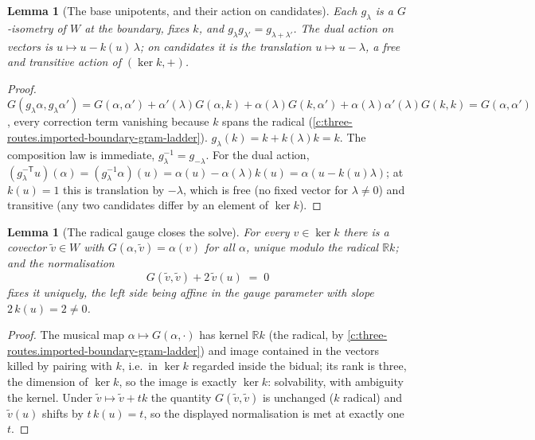 \documentclass[11pt]{article}
\newtheorem{lemma}[theorem]{Lemma}
\theoremstyle{definition}
\theoremstyle{plain}
\providecommand{\R}{}\renewcommand{\R}{\mathbb{R}}
\begin{document}
\begin{lemma}[The base unipotents, and their action on candidates]\label{c:three-routes.base-unipotents-their-action-candidates}
Each $g_\lambda$ is a $G$-isometry of $W$ at the boundary, fixes $k$, and $g_\lambda g_{\lambda'} = g_{\lambda + \lambda'}$. The dual action on vectors is $u \mapsto u - k(u)\,\lambda$; on candidates it is the translation $u \mapsto u - \lambda$, a free and transitive action of $(\ker k, +)$.
\end{lemma}
\begin{proof}
$G(g_\lambda\alpha, g_\lambda\alpha') = G(\alpha, \alpha') + \alpha'(\lambda)G(\alpha, k) + \alpha(\lambda)G(k, \alpha') + \alpha(\lambda)\alpha'(\lambda)G(k,k) = G(\alpha, \alpha')$, every correction term vanishing because $k$ spans the radical (\ref{c:three-routes.imported-boundary-gram-ladder}). $g_\lambda(k) = k + k(\lambda)k = k$. The composition law is immediate, $g_\lambda^{-1} = g_{-\lambda}$. For the dual action, $(g_\lambda^{-\mathsf{T}}u)(\alpha) = (g_\lambda^{-1}\alpha)(u) = \alpha(u) - \alpha(\lambda)k(u) = \alpha(u - k(u)\lambda)$; at $k(u) = 1$ this is translation by $-\lambda$, which is free (no fixed vector for $\lambda \neq 0$) and transitive (any two candidates differ by an element of $\ker k$).

\end{proof}

\begin{lemma}[The radical gauge closes the solve]\label{c:three-routes.radical-gauge-closes-solve}
For every $v \in \ker k$ there is a covector $\tilde v \in W$ with $G(\alpha, \tilde v) = \alpha(v)$ for all $\alpha$, unique modulo the radical $\R k$; and the normalisation
\[
G(\tilde v, \tilde v) + 2\,\tilde v(u) \;=\; 0
\]
fixes it uniquely, the left side being affine in the gauge parameter with slope $2\,k(u) = 2 \neq 0$.
\end{lemma}
\begin{proof}
The musical map $\alpha \mapsto G(\alpha, \cdot)$ has kernel $\R k$ (the radical, by \ref{c:three-routes.imported-boundary-gram-ladder}) and image contained in the vectors killed by pairing with $k$, i.e.\ in $\ker k$ regarded inside the bidual; its rank is three, the dimension of $\ker k$, so the image is exactly $\ker k$: solvability, with ambiguity the kernel. Under $\tilde v \mapsto \tilde v + tk$ the quantity $G(\tilde v, \tilde v)$ is unchanged ($k$ radical) and $\tilde v(u)$ shifts by $t\,k(u) = t$, so the displayed normalisation is met at exactly one $t$.

\end{proof}
\end{document}
